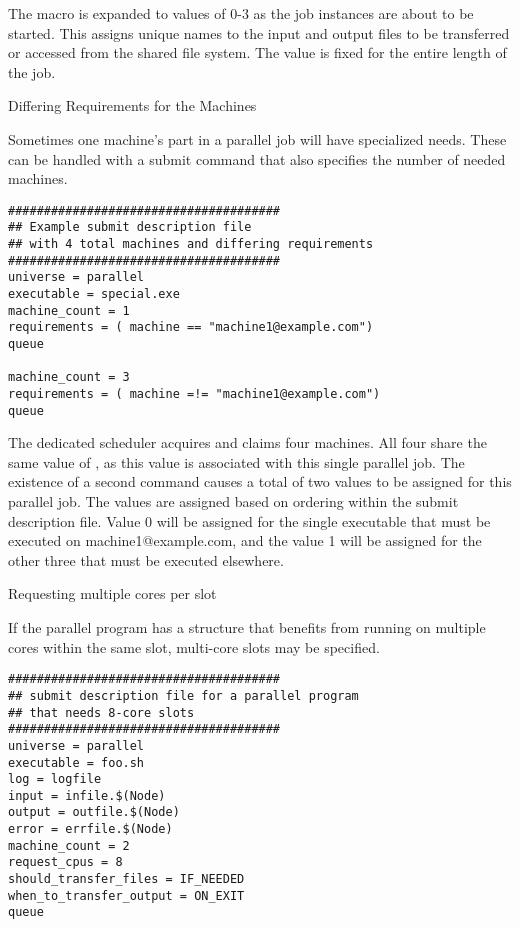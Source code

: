 The  macro is expanded to values of 0-3
as the job instances are about to be started.
This assigns unique names to the input and output files
to be transferred or accessed from the shared file system.
The  value is fixed for the entire length of the job.

\begin{description}
\item[Differing Requirements for the Machines]
\end{description}

Sometimes one machine's part in a parallel job will have specialized needs.
These can be handled with a  submit command
that also specifies the number of needed  machines. 

\footnotesize
\begin{verbatim}
######################################
## Example submit description file
## with 4 total machines and differing requirements
######################################
universe = parallel
executable = special.exe
machine_count = 1
requirements = ( machine == "machine1@example.com")
queue

machine_count = 3
requirements = ( machine =!= "machine1@example.com")
queue
\end{verbatim}
\normalsize

The dedicated scheduler acquires and claims four machines.
All four share the same value of ,
as this value is associated with this single parallel job.
The existence of a second  command causes a total of two
 values to be assigned for this parallel job.
The  values are assigned based on ordering
within the submit description file. 
Value 0 will be assigned for the single executable
that must be executed on machine1@example.com, and
the value 1 will be assigned for the other three 
that must be executed elsewhere.

\begin{description}
\item[Requesting multiple cores per slot]
\end{description}

If the parallel program has a structure that benefits from
running on multiple cores within the same slot,
multi-core slots may be specified.

\footnotesize
\begin{verbatim}
######################################
## submit description file for a parallel program
## that needs 8-core slots
######################################
universe = parallel
executable = foo.sh
log = logfile
input = infile.$(Node)
output = outfile.$(Node)
error = errfile.$(Node)
machine_count = 2
request_cpus = 8
should_transfer_files = IF_NEEDED
when_to_transfer_output = ON_EXIT
queue
\end{verbatim}
\normalsize

